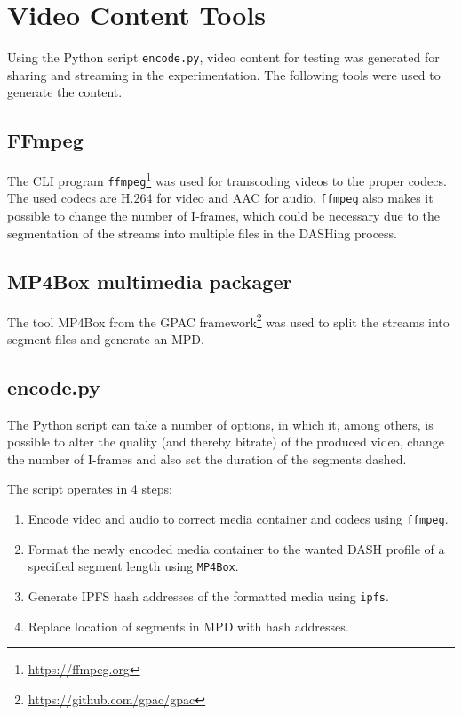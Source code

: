 \section{Video Content Tools}
\label{sec:impl-video}
Using the Python script \texttt{encode.py}, video content for testing was generated for sharing and streaming in the experimentation. The following tools were used to generate the content.

\subsection{FFmpeg}
The \ac{CLI} program \texttt{ffmpeg}\footnote{\url{https://ffmpeg.org}} was used for transcoding videos to the proper codecs. The used codecs are H.264 for video and AAC for audio. 
\texttt{ffmpeg} also makes it possible to change the number of \acp{I-frame}, which could be necessary due to the segmentation of the streams into multiple files in the DASHing process.

\subsection{MP4Box multimedia packager}
The tool MP4Box from the GPAC framework\footnote{\url{https://github.com/gpac/gpac}} was used to split the streams into segment files and generate an \ac{MPD}.

\subsection{encode.py}
The Python script can take a number of options, in which it, among others, is possible to alter the quality (and thereby bitrate) of the produced video, change the number of \acp{I-frame} and also set the duration of the segments dashed.

The script operates in 4 steps:
\begin{enumerate}
    \item Encode video and audio to correct media container and codecs using \texttt{ffmpeg}.
    \item Format the newly encoded media container to the wanted DASH profile of a specified segment length using \texttt{MP4Box}.
    \item Generate \ac{IPFS} hash addresses of the formatted media using \texttt{ipfs}.
    \item Replace location of segments in \ac{MPD} with hash addresses.
\end{enumerate}

